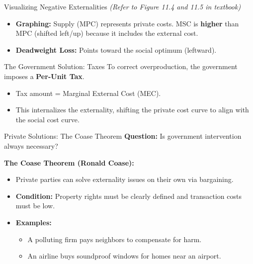 \documentclass{beamer}
\begin{document}
\begin{frame}{Visualizing Negative Externalities}
    \textit{(Refer to Figure 11.4 and 11.5 in textbook)}
    
    \begin{itemize}
        \item \textbf{Graphing:} Supply (MPC) represents private costs. MSC is \textbf{higher} than MPC (shifted left/up) because it includes the external cost.
        \item \textbf{Deadweight Loss:} Points toward the social optimum (leftward).
    \end{itemize}

    \begin{block}{The Government Solution: Taxes}
        To correct overproduction, the government imposes a \textbf{Per-Unit Tax}.
        \begin{itemize}
            \item Tax amount = Marginal External Cost (MEC).
            \item This internalizes the externality, shifting the private cost curve to align with the social cost curve.
        \end{itemize}
    \end{block}
\end{frame}

\begin{frame}{Private Solutions: The Coase Theorem}
    \textbf{Question:} Is government intervention always necessary?
    
    \vspace{0.5cm}
    
    \textbf{The Coase Theorem (Ronald Coase):}
    \begin{itemize}
        \item Private parties can solve externality issues on their own via bargaining.
        \item \textbf{Condition:} Property rights must be clearly defined and transaction costs must be low.
        \item \textbf{Examples:}
        \begin{itemize}
            \item A polluting firm pays neighbors to compensate for harm.
            \item An airline buys soundproof windows for homes near an airport.
        \end{itemize}
    \end{itemize}
\end{frame}
\end{document}
